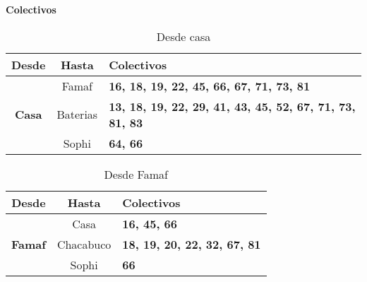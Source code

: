 \documentclass[]{article} %
\begin{document}
    \textbf{Colectivos}

    \begin{table}[H]
        \centering
            \caption{Desde casa}
            \begin{tabular}{|c|c|p{5.45cm}|}
                \hline
                \textbf{Desde} & \textbf{Hasta} & \textbf{Colectivos} \\
                \hline
                \multirow[c]{5}{*}{\textbf{Casa}} & Famaf &\textbf{\color{orange}16, 18, 19, \color{red}22, 45, \color{orange}66, 67, \color{red}71, 73, \color{blue}81}\\
                \cline{2-3}
                 & Baterias & \textbf{\color{orange}13, 18, 19, \color{red}22, 29, 41, 43, 45, 52, \color{orange}67, \color{red}71, 73, \color{blue}81, 83}\\
                \cline{2-3}
                 & Sophi & \textbf{\color{orange}64, 66}\\
                \hline
            \end{tabular}
    \end{table}
    
    \begin{table}[H]
        \centering
            \caption{Desde Famaf}
            \begin{tabular}{|c|c|p{5cm}|}
                \hline
                \textbf{Desde} & \textbf{Hasta} & \textbf{Colectivos} \\
                \hline
                \multirow[c]{3}{*}{\textbf{Famaf}} & Casa & \textbf{\color{orange}16, \color{red}45, \color{orange}66}\\
                \cline{2-3}
                 & Chacabuco & \textbf{\color{orange}18, 19, \color{red}20, 22, \color{blue}32, \color{orange}67, \color{blue}81}\\
                \cline{2-3}
                 & Sophi & \textbf{\color{orange}66}\\
                \hline
            \end{tabular}
    \end{table}
\end{document}
